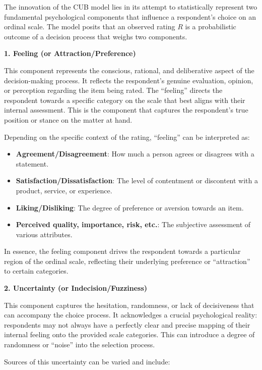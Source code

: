 \documentclass[
  letterpaper,
  DIV=11,
  numbers=noendperiod]{scrartcl}
\begin{document}
The innovation of the CUB model lies in its attempt to statistically
represent two fundamental psychological components that influence a
respondent's choice on an ordinal scale. The model posits that an
observed rating \(R\) is a probabilistic outcome of a decision process
that weighs two components.

\textbf{1. Feeling (or Attraction/Preference)}

This component represents the conscious, rational, and deliberative
aspect of the decision-making process. It reflects the respondent's
genuine evaluation, opinion, or perception regarding the item being
rated. The ``feeling'' directs the respondent towards a specific
category on the scale that best aligns with their internal assessment.
This is the component that captures the respondent's true position or
stance on the matter at hand.

Depending on the specific context of the rating, ``feeling'' can be
interpreted as:

\begin{itemize}
\item
  \textbf{Agreement/Disagreement}: How much a person agrees or disagrees
  with a statement.
\item
  \textbf{Satisfaction/Dissatisfaction}: The level of contentment or
  discontent with a product, service, or experience.
\item
  \textbf{Liking/Disliking}: The degree of preference or aversion
  towards an item.
\item
  \textbf{Perceived quality, importance, risk, etc.}: The subjective
  assessment of various attributes.
\end{itemize}

In essence, the feeling component drives the respondent towards a
particular region of the ordinal scale, reflecting their underlying
preference or ``attraction'' to certain categories.

\textbf{2. Uncertainty (or Indecision/Fuzziness)}

This component captures the hesitation, randomness, or lack of
decisiveness that can accompany the choice process. It acknowledges a
crucial psychological reality: respondents may not always have a
perfectly clear and precise mapping of their internal feeling onto the
provided scale categories. This can introduce a degree of randomness or
``noise'' into the selection process.

Sources of this uncertainty can be varied and include:
\end{document}
